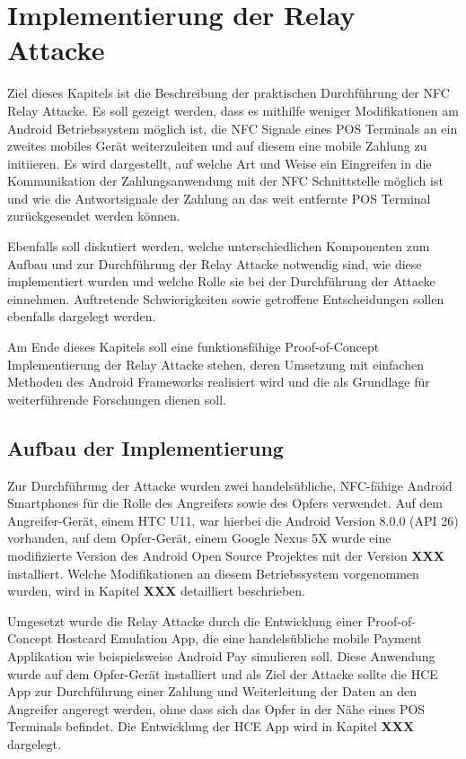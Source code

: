 \chapter{Implementierung der Relay Attacke}
\label{sec:problemdescription}

Ziel dieses Kapitels ist die Beschreibung der praktischen Durchführung der NFC Relay Attacke. Es soll gezeigt werden, dass es mithilfe weniger Modifikationen am Android Betriebssystem möglich ist, die NFC Signale eines POS Terminals an ein zweites mobiles Gerät weiterzuleiten und auf diesem eine mobile Zahlung zu initiieren. Es wird dargestellt, auf welche Art und Weise ein Eingreifen in die Kommunikation der Zahlungsanwendung mit der NFC Schnittstelle möglich ist und wie die Antwortsignale der Zahlung an das weit entfernte POS Terminal zurückgesendet werden können. 

Ebenfalls soll diskutiert werden, welche unterschiedlichen Komponenten zum Aufbau und zur Durchführung der Relay Attacke notwendig sind, wie diese implementiert wurden und welche Rolle sie bei der Durchführung der Attacke einnehmen. Auftretende Schwierigkeiten sowie getroffene Entscheidungen sollen ebenfalls dargelegt werden.

Am Ende dieses Kapitels soll eine funktionsfähige Proof-of-Concept Implementierung der Relay Attacke stehen, deren Umsetzung mit einfachen Methoden des Android Frameworks realisiert wird und die als Grundlage für weiterführende Forschungen dienen soll. 

\section{Aufbau der Implementierung}

Zur Durchführung der Attacke wurden zwei handelsübliche, NFC-fähige Android Smartphones für die Rolle des Angreifers sowie des Opfers verwendet. Auf dem Angreifer-Gerät, einem HTC U11, war hierbei die Android Version 8.0.0 (API 26) vorhanden, auf dem Opfer-Gerät, einem Google Nexus 5X wurde eine modifizierte Version des Android Open Source Projektes mit der Version \textbf{XXX} installiert. Welche Modifikationen an diesem Betriebssystem vorgenommen wurden, wird in Kapitel \textbf{XXX} detailliert beschrieben.

Umgesetzt wurde die Relay Attacke durch die Entwicklung einer Proof-of-Concept Hostcard Emulation App, die eine handelsübliche mobile Payment Applikation wie beispielsweise Android Pay simulieren soll. Diese Anwendung wurde auf dem Opfer-Gerät installiert und als Ziel der Attacke sollte die HCE App zur Durchführung einer Zahlung und Weiterleitung der Daten an den Angreifer angeregt werden, ohne dass sich das Opfer in der Nähe eines POS Terminals befindet. Die Entwicklung der HCE App wird in Kapitel \textbf{XXX} dargelegt. 

